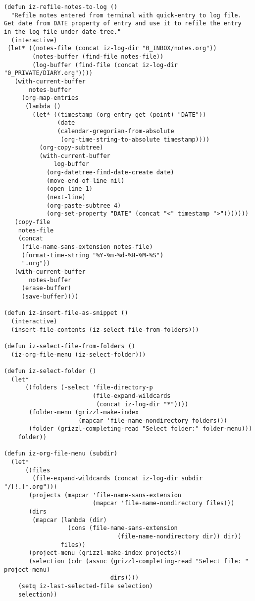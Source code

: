 \documentclass[nofonts]{tufte-handout}
\begin{document}
\begin{verbatim}
(defun iz-refile-notes-to-log ()
  "Refile notes entered from terminal with quick-entry to log file.
Get date from DATE property of entry and use it to refile the entry
in the log file under date-tree."
  (interactive)
 (let* ((notes-file (concat iz-log-dir "0_INBOX/notes.org"))
        (notes-buffer (find-file notes-file))
        (log-buffer (find-file (concat iz-log-dir "0_PRIVATE/DIARY.org"))))
   (with-current-buffer
       notes-buffer
     (org-map-entries
      (lambda ()
        (let* ((timestamp (org-entry-get (point) "DATE"))
               (date
               (calendar-gregorian-from-absolute
                (org-time-string-to-absolute timestamp))))
          (org-copy-subtree)
          (with-current-buffer
              log-buffer
            (org-datetree-find-date-create date)
            (move-end-of-line nil)
            (open-line 1)
            (next-line)
            (org-paste-subtree 4)
            (org-set-property "DATE" (concat "<" timestamp ">")))))))
   (copy-file
    notes-file
    (concat
     (file-name-sans-extension notes-file)
     (format-time-string "%Y-%m-%d-%H-%M-%S")
     ".org"))
   (with-current-buffer
       notes-buffer
     (erase-buffer)
     (save-buffer))))

(defun iz-insert-file-as-snippet ()
  (interactive)
  (insert-file-contents (iz-select-file-from-folders)))

(defun iz-select-file-from-folders ()
  (iz-org-file-menu (iz-select-folder)))

(defun iz-select-folder ()
  (let*
      ((folders (-select 'file-directory-p
                         (file-expand-wildcards
                          (concat iz-log-dir "*"))))
       (folder-menu (grizzl-make-index
                     (mapcar 'file-name-nondirectory folders)))
       (folder (grizzl-completing-read "Select folder:" folder-menu)))
    folder))

(defun iz-org-file-menu (subdir)
  (let*
      ((files
        (file-expand-wildcards (concat iz-log-dir subdir "/[!.]*.org")))
       (projects (mapcar 'file-name-sans-extension
                         (mapcar 'file-name-nondirectory files)))
       (dirs
        (mapcar (lambda (dir)
                  (cons (file-name-sans-extension
                                (file-name-nondirectory dir)) dir))
                files))
       (project-menu (grizzl-make-index projects))
       (selection (cdr (assoc (grizzl-completing-read "Select file: " project-menu)
                              dirs))))
    (setq iz-last-selected-file selection)
    selection))


\end{verbatim}
\end{document}
